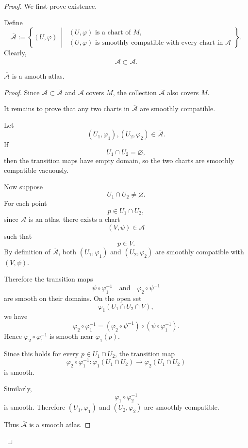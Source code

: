 \begin{proof}
We first prove existence.

Define
\[
  \overline{\mathcal A}
  :=
  \left\{
    (U,\varphi)
    \ \middle|\
    \begin{array}{l}
      (U,\varphi) \text{ is a chart of } M,\\
      (U,\varphi) \text{ is smoothly compatible with every chart in } \mathcal A
    \end{array}
  \right\}.
\]
Clearly,
\[
  \mathcal A\subset \overline{\mathcal A}.
\]

\begin{claim*}
$\overline{\mathcal A}$ is a smooth atlas.
\end{claim*}

\begin{proof}
Since $\mathcal A\subset \overline{\mathcal A}$ and $\mathcal A$ covers $M$, the collection $\overline{\mathcal A}$ also covers $M$.

It remains to prove that any two charts in $\overline{\mathcal A}$ are smoothly compatible.

Let
\[
  (U_1,\varphi_1),(U_2,\varphi_2)\in \overline{\mathcal A}.
\]
If
\[
  U_1\cap U_2=\varnothing,
\]
then the transition maps have empty domain, so the two charts are smoothly compatible vacuously.

Now suppose
\[
  U_1\cap U_2\neq \varnothing.
\]
For each point
\[
  p\in U_1\cap U_2,
\]
since $\mathcal A$ is an atlas, there exists a chart
\[
  (V,\psi)\in \mathcal A
\]
such that
\[
  p\in V.
\]
By definition of $\overline{\mathcal A}$, both $(U_1,\varphi_1)$ and $(U_2,\varphi_2)$ are smoothly compatible with $(V,\psi)$.

Therefore the transition maps
\[
  \psi\circ \varphi_1^{-1}
  \quad\text{and}\quad
  \varphi_2\circ \psi^{-1}
\]
are smooth on their domains. On the open set
\[
  \varphi_1(U_1\cap U_2\cap V),
\]
we have
\[
  \varphi_2\circ \varphi_1^{-1}
  =
  \left(\varphi_2\circ \psi^{-1}\right)
  \circ
  \left(\psi\circ \varphi_1^{-1}\right).
\]
Hence $\varphi_2\circ \varphi_1^{-1}$ is smooth near $\varphi_1(p)$.

Since this holds for every $p\in U_1\cap U_2$, the transition map
\[
  \varphi_2\circ \varphi_1^{-1}:
  \varphi_1(U_1\cap U_2)\to \varphi_2(U_1\cap U_2)
\]
is smooth.

Similarly,
\[
  \varphi_1\circ \varphi_2^{-1}
\]
is smooth. Therefore $(U_1,\varphi_1)$ and $(U_2,\varphi_2)$ are smoothly compatible.

Thus $\overline{\mathcal A}$ is a smooth atlas.
\end{proof}


\end{proof}
